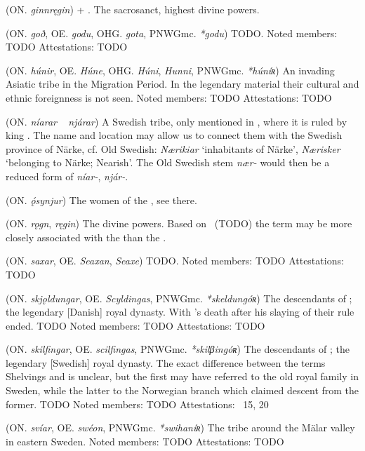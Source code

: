 \begin{itemize}
 (ON. \emph{ginnręgin})
   + . The sacrosanct, highest divine powers.

 (ON. \emph{goð}, OE. \emph{godu}, OHG. \emph{gota}, PNWGmc. \emph{*godu})
  TODO.
  Noted members: TODO
  Attestations: TODO

 (ON. \emph{húnir}, OE. \emph{Húne}, OHG. \emph{Húni}, \emph{Hunni}, PNWGmc. \emph{*húníʀ})
  An invading Asiatic tribe in the Migration Period. In the legendary material their cultural and ethnic foreignness is not seen.
  Noted members: TODO
  Attestations: TODO

 (ON. \emph{níarar} ~ \emph{njárar})
  A Swedish tribe, only mentioned in \Volundarkvida, where it is ruled by king . The name and location may allow us to connect them with the Swedish province of Närke, cf. Old Swedish: \emph{Nærikiar} ‘inhabitants of Närke’, \emph{Nærisker} ‘belonging to Närke; Nearish’. The Old Swedish stem \emph{nær-} would then be a reduced form of \emph{níar-}, \emph{njár-}.

 (ON. \emph{ǫ́synjur})
  The women of the , see there.

 (ON. \emph{rǫgn}, \emph{ręgin})
  The divine powers. Based on \Vafthrudnismal\ (TODO) the term may be more closely associated with the  than the .

 (ON. \emph{saxar}, OE. \emph{Seaxan}, \emph{Seaxe})
  TODO.
  Noted members: TODO
  Attestations: TODO

 (ON. \emph{skjǫldungar}, OE. \emph{Scyldingas}, PNWGmc. \emph{*skeldungóʀ})
  The descendants of ; the legendary [Danish] royal dynasty. With 's death after his slaying of  their rule ended. TODO
  Noted members: TODO
  Attestations: TODO

 (ON. \emph{skilfingar}, OE. \emph{scilfingas}, PNWGmc. \emph{*skilβingóʀ})
  The descendants of ; the legendary [Swedish] royal dynasty. The exact difference between the terms Shelvings and  is unclear, but the first may have referred to the old royal family in Sweden, while the latter to the Norwegian branch which claimed descent from the former. TODO
  Noted members: TODO
  Attestations: \Hyndluljod\ 15, 20

 (ON. \emph{svíar}, OE. \emph{swéon}, PNWGmc. \emph{*swihaníʀ})
  The tribe around the Mälar valley in eastern Sweden.
  Noted members: TODO
  Attestations: TODO


\end{itemize}
